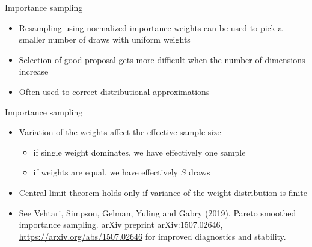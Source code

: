 \documentclass[finnish,english,t]{beamer}
\begin{document}
\begin{frame}{Importance sampling}

  \begin{itemize}
  \item Resampling using normalized importance weights can be used to
    pick a smaller number of draws with uniform weights
  \item Selection of good proposal gets more difficult when the
      number of dimensions increase
    \item Often used to correct distributional approximations
  \end{itemize}

\end{frame}

\begin{frame}{Importance sampling}

  \begin{itemize}
  \item Variation of the weights affect the effective sample size
    \begin{itemize}
    \item if single weight dominates, we have effectively one sample
    \item if weights are equal, we have effectively $S$ draws
    \end{itemize}
  \item Central limit theorem holds only if variance of the weight
    distribution is finite
  \item See Vehtari, Simpson, Gelman, Yuling and Gabry (2019). Pareto
    smoothed importance sampling. arXiv preprint arXiv:1507.02646,
    \url{https://arxiv.org/abs/1507.02646} for improved diagnostics
    and stability.
  \end{itemize}

\end{frame}
\end{document}

